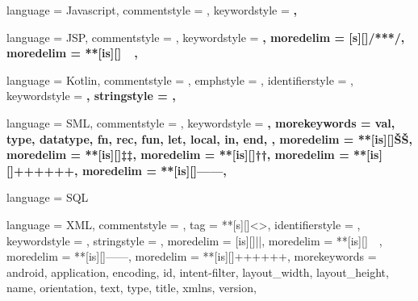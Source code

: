  {
	language = Javascript,
	commentstyle = \color{ashgrey},
	keywordstyle = \color{black}\bfseries,
}

 {
	language = JSP,
	commentstyle = \color{ashgrey},
	keywordstyle = \color{black}\bfseries,
	moredelim = [s][\color{ashgrey}]{/**}{*/},		%
	moredelim = **[is][\color{red}]{~}{~},			%
}

 {
	language = Kotlin,
	commentstyle = \color{gray}\ttfamily,
	emphstyle = {\color{OrangeRed}},
	identifierstyle = \color{black},
	keywordstyle = \color{NavyBlue}\bfseries,
	stringstyle = \color{ForestGreen}\ttfamily,
}

 {
	language = SML,
	commentstyle = \color{ashgrey},
	keywordstyle = \color{black}\bfseries,
	morekeywords = {
		val, type, datatype,
		fn, rec, fun,
		let, local, in, end,
	},
	moredelim = **[is][{\btHL[fill=orange!60]}]{Š}{Š},
	moredelim = **[is][{\btHL[fill=yellow!60]}]{‡}{‡},
	moredelim = **[is][{\btHL[fill=ForestGreen]}]{†}{†},
	moredelim = **[is][{\btHL[fill=green!30]}]{+++}{+++},
	moredelim = **[is][\btHL]{---}{---},
}

 {
	language = SQL
}

 {
	language = XML,
	commentstyle = \color{ashgrey},
	tag = **[s][\color{darkblue}\renewcommand\delimstyle{\color{black}}]<>,
	identifierstyle = \color{darkblue},
	keywordstyle = \color{cyan},
	stringstyle = \color{ForestGreen},
	moredelim = [is][\soutthick]{|}{|},
	moredelim = **[is][\color{red}]{~}{~},
	moredelim = **[is][\btHL]{---}{---},
	moredelim = **[is][{\btHL[fill=green!30]}]{+++}{+++},
	morekeywords = {
		android, application, encoding,
		id, intent-filter,
		layout_width, layout_height,
		name, orientation, text, type, title, xmlns, version,
	}
}
